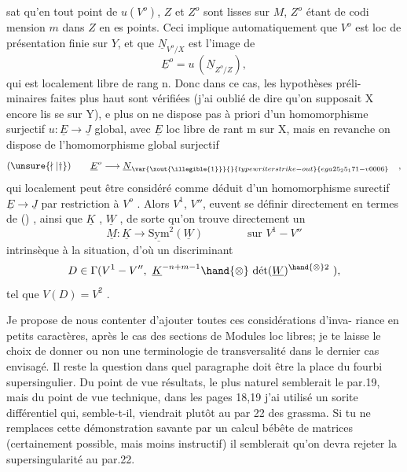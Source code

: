 
sat qu'en tout point de $u(V^{o})$, $Z$ et $Z^{o}$ sont lisses sur $M$, $Z^{o}$ étant de codi
mension $m$ dans $Z$ en es points. Ceci implique automatiquement que $V^{o}$ est
loc de présentation finie sur $Y$, et que $\underline{N}_{V^{o}/X}$ est l'image de
\[ \underline{E}^{o} = u\,(\underline{N}_{Z^{o}/Z}) , \]
qui est localement libre de rang n. Donc dans ce cas, les hypothèses préli-%
minaires faites plus haut sont vérifiées (j'ai oublié de dire qu'on supposait
X encore lis se sur Y), e plus on ne dispose pas à priori d'un homomorphisme
surjectif $u:\underline{E}\rightarrow\underline{J}$ global, avec $\underline{E}$ loc libre de rant m sur X, mais en revanche
on dispose de l'homomorphisme global surjectif
\[ (\unsure{\nmid|\dagger}) \qquad \underline{E}^{o}\longrightarrow \underline{N}_{\var{\xout{\illegible{1}}}{}{typewriter strike-out}{ega25_25_171-v0006}} \quad , \]
qui localement peut être considéré comme déduit d'un homomorphisme surectif
$\underline{E}\rightarrow\underline{J}$ par restriction à $V^{o}$ . Alors $V^{1}$, $V''$, euvent se définir directement
en termes de (\unsure{$\nmid$|$\dagger$}) , ainsi que $\underline{K}$ , $\underline{W}$ , de sorte qu'on trouve directement un
\[ \underline{M} : \underline{K}\rightarrow \underline{\mathrm{Sym}}^{2}(\underline{W}) \qquad\qquad \text{sur } V^{1}-V'' \]
intrinsèque à la situation, d'où  un discriminant
\[ D \in \Gamma(V^{1}-V'',\ \underline{K}^{-n+m-1}\hand{\otimes}\ \text{dét}(\underline{W})^{\hand{\otimes}2}\ ), \]
tel que $V(D) = V^{2}$ .

Je propose de nous contenter d'ajouter toutes ces considérations d'inva-%
riance en petits caractères, après le cas des sections de Modules loc libres;
je te laisse le choix de donner ou non une terminologie de transversalité dans
le dernier cas envisagé. Il reste la question dans quel paragraphe doit être
la place du fourbi supersingulier. Du point de vue résultats, le plus naturel
semblerait le par.19, mais du point de vue technique, dans les pages 18,19
j'ai utilisé un sorite différentiel qui, semble-t-il, viendrait plutôt au par
22 des grassma. Si tu ne remplaces cette démonstration savante par un
calcul bébête de matrices (certainement possible, mais moins instructif) il
semblerait qu'on devra rejeter la supersingularité au par.22.


